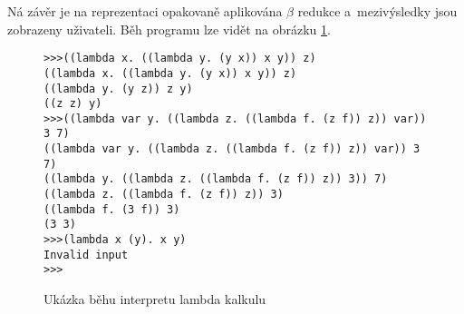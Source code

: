 		Ná závěr je na reprezentaci opakovaně aplikována $\beta$ redukce a~mezivýsledky jsou zobrazeny uživateli. Běh programu lze vidět na obrázku \ref{pic:lambdaInterpreterRun}.
		
		\begin{figure}
			\begin{verbatim}
>>>((lambda x. ((lambda y. (y x)) x y)) z)
((lambda x. ((lambda y. (y x)) x y)) z)
((lambda y. (y z)) z y)
((z z) y)
>>>((lambda var y. ((lambda z. ((lambda f. (z f)) z)) var)) 3 7)
((lambda var y. ((lambda z. ((lambda f. (z f)) z)) var)) 3 7)
((lambda y. ((lambda z. ((lambda f. (z f)) z)) 3)) 7)
((lambda z. ((lambda f. (z f)) z)) 3)
((lambda f. (3 f)) 3)
(3 3)
>>>(lambda x (y). x y)
Invalid input
>>>
			\end{verbatim}
			\caption{Ukázka běhu interpretu lambda kalkulu}
			\label{pic:lambdaInterpreterRun}
		\end{figure}
		
		
	
	